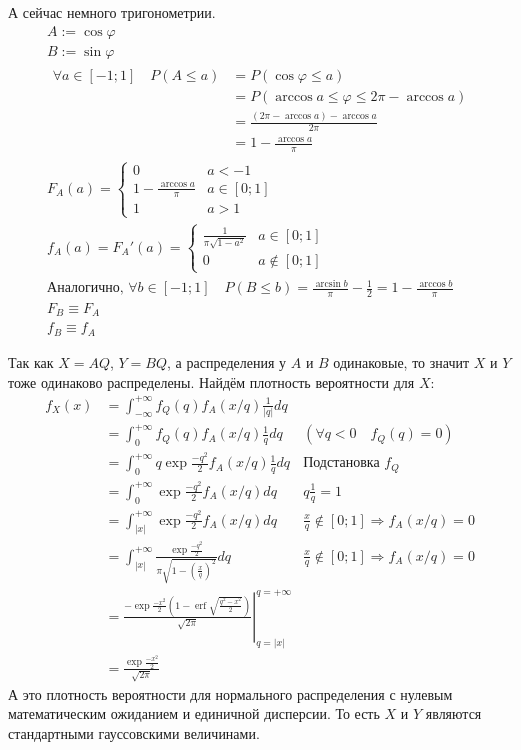 \documentclass{report}
\renewcommand{\phi}{\varphi}
\DeclareMathOperator{\erf}{erf}
\begin{document}
А сейчас немного тригонометрии.
\begin{gather*}
 A:=\cos\phi \\
 B:=\sin\phi \\
 \begin{aligned}
 \forall a \in [-1;1] \quad
 P\left(A \le a\right)&=
 P\left(\cos\phi\le a\right)
 \\&=
 P\left(\arccos a \le \phi \le 2\pi - \arccos a \right)
 \\&=
  \frac{(2\pi - \arccos a) - \arccos a}{2\pi}
  \\&=
  1-\frac{\arccos a}{\pi}
 \end{aligned}\\
  F_A(a)=
  \begin{cases}
    0 & a<-1 \\
    1-\frac{\arccos a}{\pi} & a\in\left[0;1\right] \\
    1 & a>1
  \end{cases} \\
  f_A(a)=F_A'(a)=
  \begin{cases}
    \frac{1}{\pi\sqrt{1-a^2}} & a\in\left[0;1\right] \\
    0 & a\notin\left[0;1\right]
  \end{cases}\\
 \text{Аналогично, }\forall b \in [-1;1] \quad
 P\left(B \le b\right)=
 \frac{\arcsin b}{\pi} - \frac{1}{2} =
  1-\frac{\arccos b}{\pi}\\
  F_B \equiv F_A\\
  f_B \equiv f_A
\end{gather*}

Так как $X=AQ$, $Y=BQ$, а распределения у $A$ и $B$ одинаковые,
то значит $X$ и $Y$ тоже одинаково распределены.
Найдём плотность вероятности для $X$:
\[
\begin{aligned}
    f_X(x)&=\int_{-\infty}^{+\infty} f_Q(q)f_A(x/q) \frac{1}{|q|} dq \\
    &=\int_{0}^{+\infty} f_Q(q)f_A(x/q) \frac{1}{q} dq
    & \left(\forall q<0\quad f_Q(q)=0\right) \\
    &=\int_{0}^{+\infty} q\exp{\frac{-q^2}{2}}f_A(x/q) \frac{1}{q} dq
    &\text{Подстановка $f_Q$} \\
    &=\int_{0}^{+\infty} \exp{\frac{-q^2}{2}}f_A(x/q) dq
    &q\frac{1}{q}=1\\
    &=\int_{|x|}^{+\infty} \exp{\frac{-q^2}{2}}f_A(x/q) dq
    & \frac{x}{q}\notin[0;1]\Rightarrow f_A(x/q)=0 \\
    &=\int_{|x|}^{+\infty} \frac{\exp{\frac{-q^2}{2}}}{\pi\sqrt{1-\left(\frac{x}{q}\right)^2}} dq
    & \frac{x}{q}\notin[0;1]\Rightarrow f_A(x/q)=0 \\
    &= \left. \frac{-\exp{\frac{-x^2}{2}}\left( 1-\erf\sqrt{\frac{q^2-x^2}{2}} \right)}{\sqrt{2\pi}}\right|_{q=|x|}^{q=+\infty}\\
    &=\frac{\exp \frac{-x^2}{2}}{\sqrt{2\pi}}
\end{aligned}
\]
А это плотность вероятности для нормального распределения с нулевым математическим ожиданием и единичной дисперсии.
То есть $X$ и $Y$ являются стандартными гауссовскими величинами.
\end{document}
